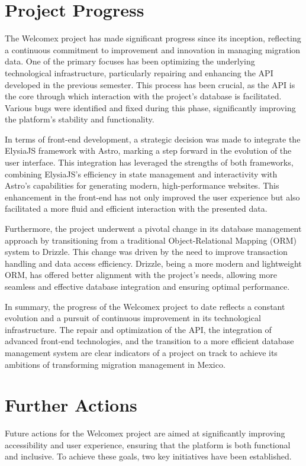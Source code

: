 \documentclass[conference]{IEEEtran}
\begin{document}
\section{Project Progress}
The Welcomex project has made significant progress since its inception, reflecting a continuous commitment to improvement and innovation in managing migration data. One of the primary focuses has been optimizing the underlying technological infrastructure, particularly repairing and enhancing the API developed in the previous semester. This process has been crucial, as the API is the core through which interaction with the project's database is facilitated. Various bugs were identified and fixed during this phase, significantly improving the platform's stability and functionality.

In terms of front-end development, a strategic decision was made to integrate the ElysiaJS framework with Astro, marking a step forward in the evolution of the user interface. This integration has leveraged the strengths of both frameworks, combining ElysiaJS's efficiency in state management and interactivity with Astro's capabilities for generating modern, high-performance websites. This enhancement in the front-end has not only improved the user experience but also facilitated a more fluid and efficient interaction with the presented data.

Furthermore, the project underwent a pivotal change in its database management approach by transitioning from a traditional Object-Relational Mapping (ORM) system to Drizzle. This change was driven by the need to improve transaction handling and data access efficiency. Drizzle, being a more modern and lightweight ORM, has offered better alignment with the project's needs, allowing more seamless and effective database integration and ensuring optimal performance.

In summary, the progress of the Welcomex project to date reflects a constant evolution and a pursuit of continuous improvement in its technological infrastructure. The repair and optimization of the API, the integration of advanced front-end technologies, and the transition to a more efficient database management system are clear indicators of a project on track to achieve its ambitions of transforming migration management in Mexico.

\section{Further Actions}
Future actions for the Welcomex project are aimed at significantly improving accessibility and user experience, ensuring that the platform is both functional and inclusive. To achieve these goals, two key initiatives have been established.
\end{document}
